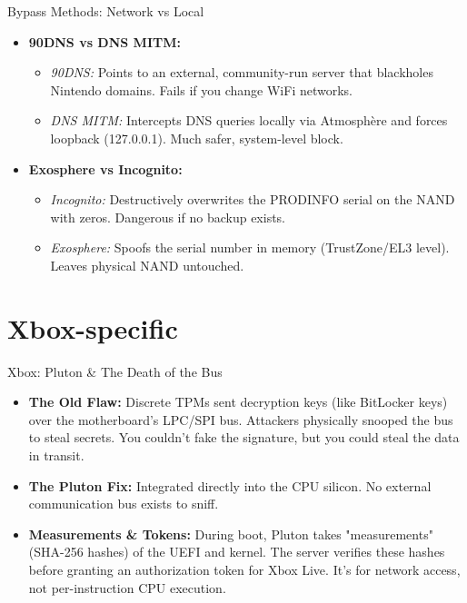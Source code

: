 \documentclass[aspectratio=169]{beamer}
\begin{document}
\begin{frame}{Bypass Methods: Network vs Local}
    \begin{itemize}
        \item \textbf{90DNS vs DNS MITM:}
        \begin{itemize}
            \item \textit{90DNS:} Points to an external, community-run server that blackholes Nintendo domains. Fails if you change WiFi networks.
            \item \textit{DNS MITM:} Intercepts DNS queries locally via Atmosphère and forces loopback (127.0.0.1). Much safer, system-level block.
        \end{itemize}
        \item \textbf{Exosphere vs Incognito:}
        \begin{itemize}
            \item \textit{Incognito:} Destructively overwrites the PRODINFO serial on the NAND with zeros. Dangerous if no backup exists.
            \item \textit{Exosphere:} Spoofs the serial number in memory (TrustZone/EL3 level). Leaves physical NAND untouched.
        \end{itemize}
    \end{itemize}
\end{frame}

\section{Xbox-specific}

\begin{frame}{Xbox: Pluton \& The Death of the Bus}
    \begin{itemize}
        \item \textbf{The Old Flaw:} Discrete TPMs sent decryption keys (like BitLocker keys) over the motherboard's LPC/SPI bus. Attackers physically snooped the bus to steal secrets. You couldn't fake the signature, but you could steal the data in transit.
        \item \textbf{The Pluton Fix:} Integrated directly into the CPU silicon. No external communication bus exists to sniff.
        \item \textbf{Measurements \& Tokens:} During boot, Pluton takes "measurements" (SHA-256 hashes) of the UEFI and kernel. The server verifies these hashes before granting an authorization token for Xbox Live. It's for network access, not per-instruction CPU execution.
    \end{itemize}
\end{frame}
\end{document}
